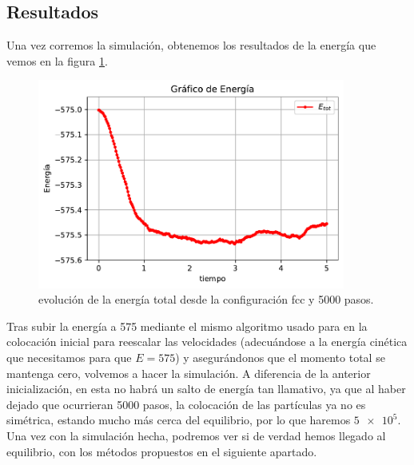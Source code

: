 \documentclass[11pt]{article} %
\begin{document}
\subsection{Resultados}

Una vez corremos la simulación, obtenemos los resultados de la energía que vemos en la figura \ref{Fig:01}. 


\begin{figure}[h!] \centering
	\includegraphics[width=0.9\textwidth]{../../Graficas/Et-equilibra.pdf}
	\caption{evolución de la energía total desde la configuración fcc y 5000 pasos.}
	\label{Fig:01}
\end{figure}	

Tras subir la energía a 575 mediante el mismo algoritmo usado para en la colocación inicial para reescalar las velocidades (adecuándose a la energía cinética que necesitamos para que $E=575$) y asegurándonos que el momento total se mantenga cero, volvemos a hacer la simulación. A diferencia de la anterior inicialización, en esta no habrá un salto de energía tan llamativo, ya que al haber dejado que ocurrieran 5000 pasos, la colocación de las partículas ya no es simétrica, estando mucho más cerca del equilibrio, por lo que haremos $\num{5e5}$. Una vez con la simulación hecha, podremos ver si de verdad hemos llegado al equilibrio, con los métodos propuestos en el siguiente apartado. 
\end{document}
